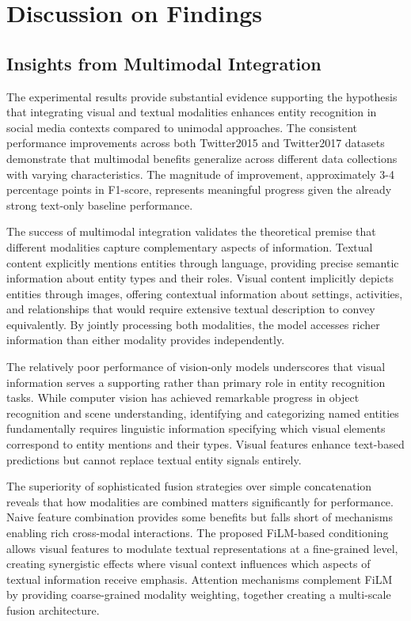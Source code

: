 \documentclass[12pt,a4paper]{report}
\begin{document}
\section{Discussion on Findings}

\subsection{Insights from Multimodal Integration}

The experimental results provide substantial evidence supporting the hypothesis that integrating visual and textual modalities enhances entity recognition in social media contexts compared to unimodal approaches. The consistent performance improvements across both Twitter2015 and Twitter2017 datasets demonstrate that multimodal benefits generalize across different data collections with varying characteristics. The magnitude of improvement, approximately 3-4 percentage points in F1-score, represents meaningful progress given the already strong text-only baseline performance.

The success of multimodal integration validates the theoretical premise that different modalities capture complementary aspects of information. Textual content explicitly mentions entities through language, providing precise semantic information about entity types and their roles. Visual content implicitly depicts entities through images, offering contextual information about settings, activities, and relationships that would require extensive textual description to convey equivalently. By jointly processing both modalities, the model accesses richer information than either modality provides independently.

The relatively poor performance of vision-only models underscores that visual information serves a supporting rather than primary role in entity recognition tasks. While computer vision has achieved remarkable progress in object recognition and scene understanding, identifying and categorizing named entities fundamentally requires linguistic information specifying which visual elements correspond to entity mentions and their types. Visual features enhance text-based predictions but cannot replace textual entity signals entirely.

The superiority of sophisticated fusion strategies over simple concatenation reveals that how modalities are combined matters significantly for performance. Naive feature combination provides some benefits but falls short of mechanisms enabling rich cross-modal interactions. The proposed FiLM-based conditioning allows visual features to modulate textual representations at a fine-grained level, creating synergistic effects where visual context influences which aspects of textual information receive emphasis. Attention mechanisms complement FiLM by providing coarse-grained modality weighting, together creating a multi-scale fusion architecture.
\end{document}
